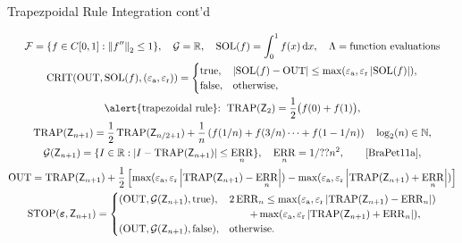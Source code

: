 \documentclass[10pt,compress,xcolor={usenames,dvipsnames},aspectratio=169]{beamer}
\DeclareMathOperator{\TRAP}{TRAP}
\DeclareMathOperator{\STOP}{STOP}
\DeclareMathOperator{\SOL}{SOL}
\DeclareMathOperator{\OUT}{OUT}
\DeclareMathOperator{\CRIT}{CRIT}
\DeclareMathOperator{\ERR}{ERR}
\newcommand{\ttrue}{\text{true}}
\newcommand{\tfalse}{\text{false}}
\newcommand{\tolabs}{\varepsilon_{\text{a}}}
\newcommand{\tolrel}{\varepsilon_{\text{r}}}
\begin{document}
\begin{frame}{Trapezpoidal Rule Integration cont'd}

\vspace{-6ex}
\begin{gather*}
	\cf = \{f \in C[0,1] : \norm[2]{f''} \le 1\}, \quad 
	\cg  = \reals,  \quad
	\SOL(f) = \int_0^1 f(x) \, \dif x, \quad   \Lambda = \text{function evaluations} \\
	\CRIT(\OUT, \SOL(f),(\tolabs, \tolrel))  = \begin{cases} \ttrue, & \abs{\SOL(f) - \OUT} \le \max(\tolabs,\tolrel \abs{\SOL(f)}), \\
		\tfalse, & \text{otherwise},
		\end{cases} \\
		\text{\alert{trapezoidal rule}: } 
		\TRAP(\mZ_2) = \frac 1{2} \bigl( f(0) + f(1) \bigr), \\  
		\TRAP(\mZ_{n+1}) = \frac {1}{2}\TRAP(\mZ_{n/2+1}) + \frac 1{n} \left( f(1/n) + f(3/n) \cdots + f(1 -1/n) \right)  \quad \log_2(n) \in \naturals,\\
		\cg(\mZ_{n+1}) = \{I \in \reals : \abs{I - \TRAP(\mZ_{n+1})} \le \ERR_n\},  \quad \ERR_n =  1/??n^2, \qquad \text{\cite[(7.??)]{BraPet11a}}, \\ 
		\OUT = \TRAP(\mZ_{n+1}) + \frac 12 \left[\max(\tolabs,\tolrel\abs{\TRAP(\mZ_{n+1})- \ERR_n}) - \max(\tolabs,\tolrel \abs{\TRAP(\mZ_{n+1}) +\ERR_n}) \right] \\
	\STOP(\veps,\mZ_{n+1}) 
	= \begin{cases} 
		(\OUT,\cg(\mZ_{n+1}), \ttrue), & 
		2\ERR_n \le  \max(\tolabs,\tolrel\abs{\TRAP(\mZ_{n+1})- \ERR_n}) \\
		& \qquad + \max(\tolabs,\tolrel\abs{\TRAP(\mZ_{n+1}) +\ERR_n}), \\
		(\OUT,\cg(\mZ_{n+1}),\tfalse), & \text{otherwise}.
	\end{cases}
\end{gather*}

\end{frame}
\end{document}

